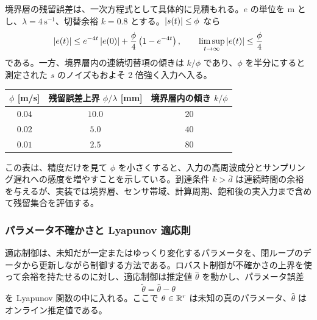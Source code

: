 境界層の残留誤差は、一次方程式として具体的に見積もれる。$e$ の単位を m とし、$\lambda=4\,\mathrm{s}^{-1}$、切替余裕 $k=0.8$ とする。$\left|s(t)\right|\le\phi$ なら
\begin{equation}
  \left|e(t)\right|
  \le e^{-4t}\left|e(0)\right|
  +\frac{\phi}{4}\left(1-e^{-4t}\right),
  \qquad
  \limsup_{t\to\infty}\left|e(t)\right|\le\frac{\phi}{4}
\end{equation}
である。一方、境界層内の連続切替項の傾きは $k/\phi$ であり、$\phi$ を半分にすると測定された $s$ のノイズもおよそ 2 倍強く入力へ入る。
\begin{center}
\begin{tabular}{c|c|c}
$\phi$ [m/s] & 残留誤差上界 $\phi/\lambda$ [mm] & 境界層内の傾き $k/\phi$\\
\hline
$0.04$ & $10.0$ & $20$\\
$0.02$ & $5.0$ & $40$\\
$0.01$ & $2.5$ & $80$
\end{tabular}
\end{center}
この表は、精度だけを見て $\phi$ を小さくすると、入力の高周波成分とサンプリング遅れへの感度を増やすことを示している。到達条件 $k>\bar{d}$ は連続時間の余裕を与えるが、実装では境界層、センサ帯域、計算周期、飽和後の実入力まで含めて残留集合を評価する。

\subsubsection{パラメータ不確かさと Lyapunov 適応則}

適応制御は、未知だが一定またはゆっくり変化するパラメータを、閉ループのデータから更新しながら制御する方法である。ロバスト制御が不確かさの上界を使って余裕を持たせるのに対し、適応制御は推定値 $\hat{\theta}$ を動かし、パラメータ誤差
\begin{equation}
  \tilde{\theta}=\hat{\theta}-\theta
\end{equation}
を Lyapunov 関数の中に入れる。ここで $\theta\in\mathbb{R}^r$ は未知の真のパラメータ、$\hat{\theta}$ はオンライン推定値である。

